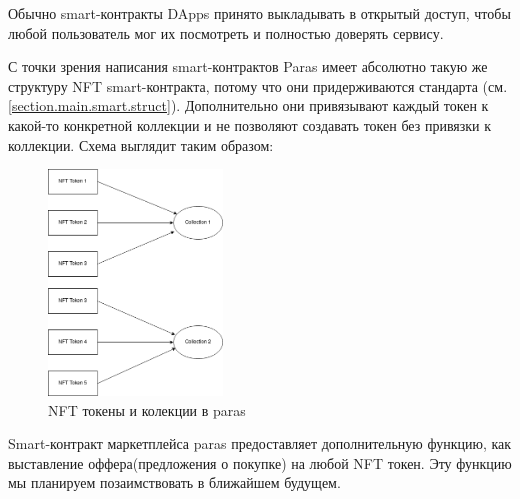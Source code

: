 \begin{remark}
    Обычно smart-контракты DApps принято выкладывать в открытый доступ, чтобы любой пользователь мог их посмотреть и полностью доверять сервису.
\end{remark}

С точки зрения написания smart-контрактов Paras имеет абсолютно такую же структуру NFT smart-контракта, потому что они придерживаются стандарта \cite{nftstandart}(см. {\color{blue} \ref{section.main.smart.struct}}).
Дополнительно они привязывают каждый токен к какой-то конкретной коллекции и не позволяют создавать токен без привязки к коллекции.
Схема выглядит таким образом:

\begin{figure}[H]
	\centering
	\includegraphics[height=60mm]{fig/parascollections.png}
	\caption{NFT токены и колекции в paras}
    \label{fig.parascollections}
\end{figure}

Smart-контракт маркетплейса paras предоставляет дополнительную функцию, как выставление оффера(предложения о покупке) на любой NFT токен. Эту функцию мы планируем позаимствовать в ближайшем будущем.


